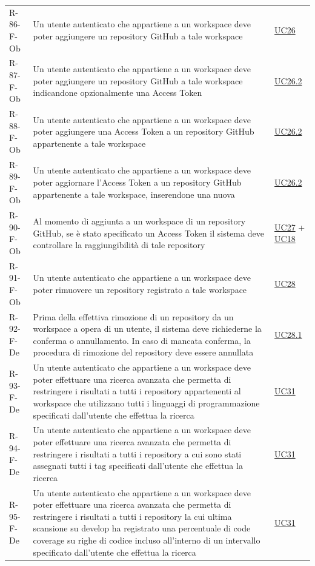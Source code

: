 \documentclass[a4paper, 11pt]{article}
\begin{document}
\begin{longtable}[c]{ >{\centering\arraybackslash}m{2.5cm} >{\centering\arraybackslash}m{8.3cm} >{\centering\arraybackslash}m{3.5cm} }
    R-86-F-Ob & Un utente autenticato che appartiene a un workspace deve poter aggiungere un repository GitHub a tale workspace & \hyperref[UC26]{UC26}\\
    R-87-F-Ob & Un utente autenticato che appartiene a un workspace deve poter aggiungere un repository GitHub a tale workspace indicandone opzionalmente una Access Token & \hyperref[UC26.2]{UC26.2}\\
    R-88-F-Ob & Un utente autenticato che appartiene a un workspace deve poter aggiungere una Access Token a un repository GitHub appartenente a tale workspace & \hyperref[UC26.2]{UC26.2}\\
    R-89-F-Ob & Un utente autenticato che appartiene a un workspace deve poter aggiornare l'Access Token a un repository GitHub appartenente a tale workspace, inserendone una nuova & \hyperref[UC26.2]{UC26.2}\\
    R-90-F-Ob & Al momento di aggiunta a un workspace di un repository GitHub, se è stato specificato un Access Token il sistema deve controllare la raggiungibilità di tale repository & \hyperref[UC27]{UC27} + \hyperref[UC18]{UC18}\\
    R-91-F-Ob & Un utente autenticato che appartiene a un workspace deve poter rimuovere un repository registrato a tale workspace & \hyperref[UC28]{UC28}\\
    R-92-F-De & Prima della effettiva rimozione di un repository da un workspace a opera di un utente, il sistema deve richiederne la conferma o annullamento. In caso di mancata conferma, la procedura di rimozione del repository deve essere annullata & \hyperref[UC28.1]{UC28.1}\\
    R-93-F-De & Un utente autenticato che appartiene a un workspace deve poter effettuare una ricerca avanzata che permetta di restringere i risultati a tutti i repository appartenenti al workspace che utilizzano tutti i linguaggi di programmazione specificati dall'utente che effettua la ricerca & \hyperref[UC31]{UC31}\\
    R-94-F-De & Un utente autenticato che appartiene a un workspace deve poter effettuare una ricerca avanzata che permetta di restringere i risultati a tutti i repository a cui sono stati assegnati tutti i tag specificati dall'utente che effettua la ricerca & \hyperref[UC31]{UC31}\\
    R-95-F-De & Un utente autenticato che appartiene a un workspace deve poter effettuare una ricerca avanzata che permetta di restringere i risultati a tutti i repository la cui ultima scansione su develop ha registrato una percentuale di code coverage su righe di codice incluso all'interno di un intervallo specificato dall'utente che effettua la ricerca & \hyperref[UC31]{UC31}\\

\end{longtable}
\end{document}
